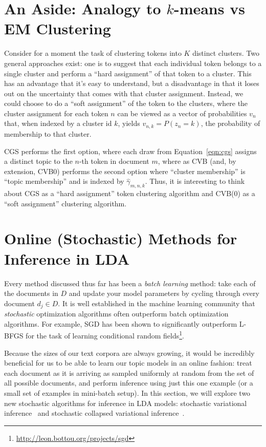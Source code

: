 \documentclass[11pt]{article}
\begin{document}
\section{An Aside: Analogy to $k$-means vs EM Clustering}

Consider for a moment the task of clustering tokens into $K$ distinct
clusters. Two general approaches exist: one is to suggest that each
individual token belongs to a single cluster and perform a ``hard
assignment'' of that token to a cluster. This has an advantage that it's
easy to understand, but a disadvantage in that it loses out on the
uncertainty that comes with that cluster assignment. Instead, we could
choose to do a ``soft assignment'' of the token to the clusters, where the
cluster assignment for each token $n$ can be viewed as a vector of
probabilities $v_n$ that, when indexed by a cluster id $k$, yields
$v_{n,k} = P(z_n = k)$, the probability of membership to that cluster.

CGS performs the first option, where each draw from Equation~\ref{eqn:cgs}
assigns a distinct topic to the $n$-th token in document $m$, where as CVB
(and, by extension, CVB0) performs the second option where ``cluster
membership'' is ``topic membership'' and is indexed by
$\hat{\gamma}_{m,n,k}$. Thus, it is interesting to think about CGS as a
``hard assignment'' token clustering algorithm and CVB(0) as a ``soft
assignment'' clustering algorithm.

\section{Online (Stochastic) Methods for Inference in LDA}

Every method discussed thus far has been a \emph{batch learning} method:
take each of the documents in $D$ and update your model parameters by
cycling through every document $d_j \in D$. It is well established in the
machine learning community that \emph{stochastic} optimization algorithms
often outperform batch optimization algorithms. For example, SGD has been
shown to significantly outperform L-BFGS for the task of learning
conditional random
fields\footnote{\url{http://leon.bottou.org/projects/sgd}}.

Because the sizes of our text corpora are always growing, it would be
incredibly beneficial for us to be able to learn our topic models in an
online fashion: treat each document as it is arriving as sampled uniformly
at random from the set of all possible documents, and perform inference
using just this one example (or a small set of examples in mini-batch
setup). In this section, we will explore two new stochastic algorithms for
inference in LDA models: stochastic variational
inference~\cite{Hoffman:2013:svb} and stochastic collapsed variational
inference~\cite{Foulds:2013:scvb}.
\end{document}
